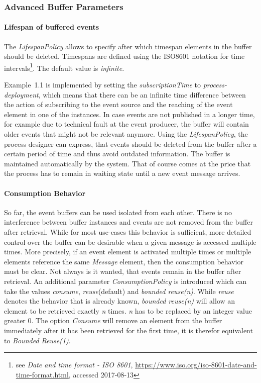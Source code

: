 \subsubsection{Advanced Buffer Parameters}\label{ch:bpmnx:bufferpolicies}

\paragraph{Lifespan of buffered events\newline}

The \textit{LifespanPolicy} allows to specify after which timespan elements in the buffer should be deleted. Timespans are defined using the ISO8601 notation for time intervals\footnote{see \textit{Date and time format - ISO 8601}, \url{https://www.iso.org/iso-8601-date-and-time-format.html}, accessed 2017-08-13}. 
The default value is \textit{infinite}.

Example~1.1 is implemented by setting the \textit{subscriptionTime} to \textit{process-deployment}, which means that there can be an infinite time difference between the action of subscribing to the event source and the reaching of the event element in one of the instances. 
In case events are not published in a longer time, for example due to technical fault at the event producer, the buffer will contain older events that might not be relevant anymore.
Using the \textit{LifespanPolicy}, the process designer can express, that events should be deleted from the buffer after a certain period of time and thus avoid outdated information. The buffer is maintained automatically by the system.
That of course comes at the price that the process has to remain in waiting state until a new event message arrives.

\paragraph{Consumption Behavior\newline}

So far, the event buffers can be used isolated from each other. There is no interference between buffer instances and events are not removed from the buffer after retrieval.
While for most use-cases this behavior is sufficient, more detailed control over the buffer can be desirable when a given message is accessed multiple times. More precisely, if an event element is activated multiple times or multiple elements reference the same \textit{Message} element, then the consumption behavior must be clear.
Not always is it wanted, that events remain in the buffer after retrieval.
An additional parameter \textit{ConsumptionPolicy} is introduced which can take the values \textit{consume}, \textit{reuse}(default) and \textit{bounded reuse(n)}.
While \textit{reuse} denotes the behavior that is already known, \textit{bounded reuse(n)} will allow an element to be retrieved exactly \textit{n} times. \textit{n} has to be replaced by an integer value greater 0.
The option \textit{Consume} will remove an element from the buffer immediately after it has been retrieved for the first time, it is therefor equivalent to \textit{Bounded Reuse(1)}.

